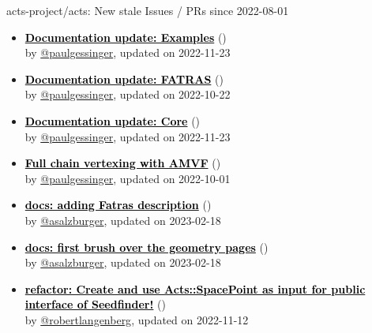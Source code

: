 \begin{frame}[allowframebreaks]{ acts-project/acts: New stale Issues / PRs since 2022-08-01 }
\begin{itemize}
    \item\iss\prstale\textbf{\href{https://github.com/acts-project/acts/issues/1420}{\textcolor{black}{Documentation update: Examples}}}
    (\href{https://github.com/acts-project/acts/issues/1420}{}) \\
    by \href{https://github.com/paulgessinger}{@paulgessinger}, updated on 2022-11-23

    \item\iss\prstale\textbf{\href{https://github.com/acts-project/acts/issues/1419}{\textcolor{black}{Documentation update: FATRAS}}}
    (\href{https://github.com/acts-project/acts/issues/1419}{}) \\
    by \href{https://github.com/paulgessinger}{@paulgessinger}, updated on 2022-10-22

    \item\iss\prstale\textbf{\href{https://github.com/acts-project/acts/issues/1418}{\textcolor{black}{Documentation update: Core}}}
    (\href{https://github.com/acts-project/acts/issues/1418}{}) \\
    by \href{https://github.com/paulgessinger}{@paulgessinger}, updated on 2022-11-23

    \item\iss\prstale\textbf{\href{https://github.com/acts-project/acts/issues/1406}{\textcolor{black}{Full chain vertexing with AMVF}}}
    (\href{https://github.com/acts-project/acts/issues/1406}{}) \\
    by \href{https://github.com/paulgessinger}{@paulgessinger}, updated on 2022-10-01

    \item\propen\prwip\prstale\textbf{\href{https://github.com/acts-project/acts/pull/1402}{\textcolor{black}{docs: adding Fatras description}}}
    (\href{https://github.com/acts-project/acts/pull/1402}{}) \\
    by \href{https://github.com/asalzburger}{@asalzburger}, updated on 2023-02-18

    \item\propen\prwip\prstale\textbf{\href{https://github.com/acts-project/acts/pull/1395}{\textcolor{black}{docs: first brush over the geometry pages}}}
    (\href{https://github.com/acts-project/acts/pull/1395}{}) \\
    by \href{https://github.com/asalzburger}{@asalzburger}, updated on 2023-02-18

    \item\propen\prwip\prstale\textbf{\href{https://github.com/acts-project/acts/pull/1394}{\textcolor{black}{refactor: Create and use Acts::SpacePoint as input for public interface of Seedfinder!}}}
    (\href{https://github.com/acts-project/acts/pull/1394}{}) \\
    by \href{https://github.com/robertlangenberg}{@robertlangenberg}, updated on 2022-11-12


\end{itemize}
\end{frame}

